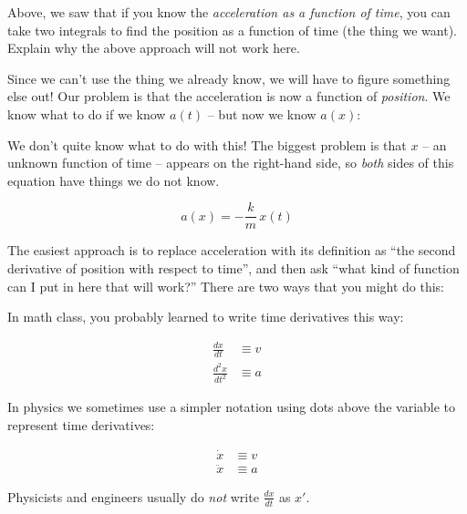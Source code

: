 \documentclass[12pt]{article}
\begin{document}
\vspace{1in}



Above, we saw that if you know the {\it acceleration as a function of time}, you can take two integrals to find the position as a function of time (the thing we want). Explain why the above approach will not work here. 

\vspace{1in}
\newpage
Since we can't use the thing we already know, we will have to figure something else out! Our problem is that the acceleration is now a function of {\it position}. We know what to do if we know $a(t)$ -- but now we know $a(x)$:

We don't quite know what to do with this! The biggest problem is that $x$ -- an unknown function of time -- appears on the right-hand side, so {\it both} sides of this equation have things we do not know.

$$a(x) = -\frac{k}{m}\,x(t)$$

The easiest approach is to replace acceleration with its definition as ``the second derivative of position with respect to time'', and then ask ``what kind of function can I put in here that will work?'' There are two ways that you might do this:

\vspace{0.3in}

\begin{center}\underline{\hspace{6in}}\end{center}

\begin{minipage}{0.46\textwidth}

In math class, you probably learned to write time derivatives this way:

\begin{align*}
\frac{dx}{dt} &\equiv v \\
\frac{d^2x}{dt^2} &\equiv a 
\end{align*}
\end{minipage}
\begin{minipage}{0.46\textwidth}
In physics we sometimes use a simpler notation using dots above the variable to represent time derivatives:

\begin{align*}
\dot x &\equiv v \\
\ddot x &\equiv a 
\end{align*}

Physicists and engineers usually do {\it not} write $\frac{dx}{dt}$ as $x'$.



\end{minipage}
\begin{center}\underline{\hspace{6in}}\end{center}
\end{document}
